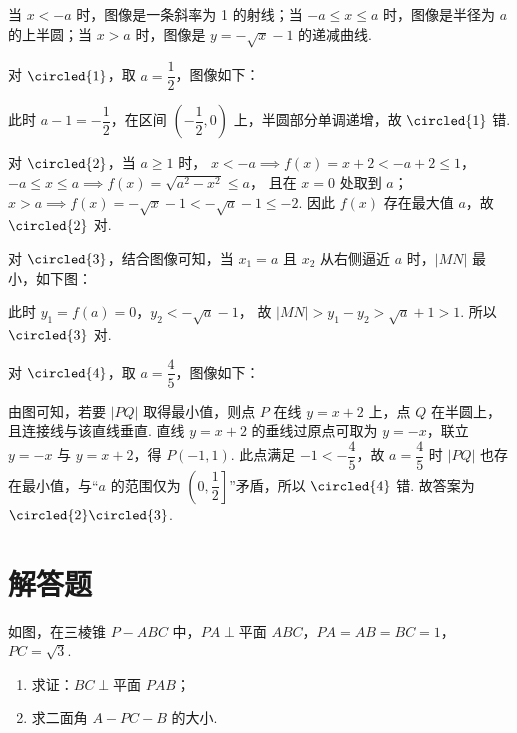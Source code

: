 \begin{solution}
当 \(x<-a\) 时，图像是一条斜率为 1 的射线；当 \(-a\le x\le a\) 时，图像是半径为 \(a\) 的上半圆；当 \(x>a\) 时，图像是 \(y=-\sqrt{x}-1\) 的递减曲线.

对 \(\circled{1}\)，取 \(a=\dfrac{1}{2}\)，图像如下：


此时 \(a-1=-\dfrac{1}{2}\)，在区间 \(\left(-\dfrac{1}{2},0\right)\) 上，半圆部分单调递增，故 \(\circled{1}\) 错.

对 \(\circled{2}\)，当 \(a\ge 1\) 时，
\(x<-a \implies f(x)=x+2<-a+2\le 1\)，
\(-a\le x\le a \implies f(x)=\sqrt{a^2-x^2}\le a\)，
且在 \(x=0\) 处取到 \(a\)；
\(x>a \implies f(x)=-\sqrt{x}-1<-\sqrt{a}-1\le -2\).
因此 \(f(x)\) 存在最大值 \(a\)，故 \(\circled{2}\) 对.

对 \(\circled{3}\)，结合图像可知，当 \(x_1=a\) 且 \(x_2\) 从右侧逼近 \(a\) 时，\(|MN|\) 最小，如下图：


此时
\(y_1=f(a)=0\)，\(y_2<-\sqrt{a}-1\)，
故
\(|MN|>y_1-y_2>\sqrt{a}+1>1\).
所以 \(\circled{3}\) 对.

对 \(\circled{4}\)，取 \(a=\dfrac{4}{5}\)，图像如下：


由图可知，若要 \(|PQ|\) 取得最小值，则点 \(P\) 在线 \(y=x+2\) 上，点 \(Q\) 在半圆上，且连接线与该直线垂直. 直线 \(y=x+2\) 的垂线过原点可取为 \(y=-x\)，联立 \(y=-x\) 与 \(y=x+2\)，得 \(P(-1,1)\).
此点满足 \(-1<-\dfrac{4}{5}\)，故 \(a=\dfrac{4}{5}\) 时 \(|PQ|\) 也存在最小值，与“\(a\) 的范围仅为 \(\left(0,\dfrac{1}{2}\right]\)”矛盾，所以 \(\circled{4}\) 错.
故答案为 \(\circled{2}\circled{3}\).
\end{solution}
\section{解答题}

\begin{problem}
如图，在三棱锥 \(P-ABC\) 中，\(PA\perp \text{平面 }ABC\)，\(PA=AB=BC=1\)，\(PC=\sqrt{3}\).

\begin{enumerate}
\item 求证：\(BC\perp \text{平面 }PAB\)；
\item 求二面角 \(A-PC-B\) 的大小.
\end{enumerate}

\end{problem}

